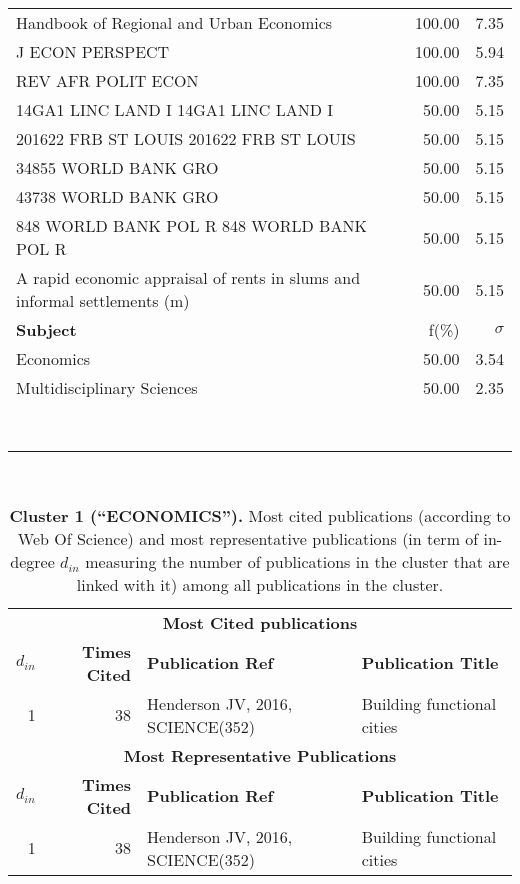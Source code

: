 \documentclass[a4paper,11pt]{report}
\begin{document}
\begin{landscape}
\begin{table}[!ht]
{\begin{tabular}{|p{8cm} r r|}
Handbook of Regional and Urban Economics & 100.00 & 7.35\\
J ECON PERSPECT & 100.00 & 5.94\\
REV AFR POLIT ECON & 100.00 & 7.35\\
14GA1 LINC LAND I 14GA1 LINC LAND I & 50.00 & 5.15\\
201622 FRB ST LOUIS 201622 FRB ST LOUIS & 50.00 & 5.15\\
34855 WORLD BANK GRO & 50.00 & 5.15\\
43738 WORLD BANK GRO & 50.00 & 5.15\\
848 WORLD BANK POL R 848 WORLD BANK POL R & 50.00 & 5.15\\
A rapid economic appraisal of rents in slums and informal settlements (m) & 50.00 & 5.15\\
\hline
{\bf Subject }& f(\%) & $\sigma$\\
\hline
Economics & 50.00 & 3.54\\
Multidisciplinary Sciences & 50.00 & 2.35\\
 &  & \\
 &  & \\
 &  & \\
 &  & \\
 &  & \\
 &  & \\
 &  & \\
 &  & \\
\hline
\end{tabular}
}
\end{table}

\clearpage

\begin{table}[!ht]
\caption*{{\bf Cluster 1 (``ECONOMICS'').} Most cited publications (according to Web Of Science) and most representative publications (in term of in-degree $d_{in}$ measuring the number of publications in the cluster that are linked with it) among all publications in the cluster.}
\textcolor{white}{aa}\\
{\scriptsize\begin{tabular}{|r r p{7cm} p{17cm}|}
\hline
\multicolumn{4}{|c|}{{\bf Most Cited publications}}\\
{\bf $d_{in}$} & {\bf Times Cited} & {\bf Publication Ref} & {\bf Publication Title} \\
1 & 38 & Henderson JV, 2016, SCIENCE(352) & Building functional cities\\
\hline
\hline
\multicolumn{4}{|c|}{{\bf Most Representative Publications}}\\
{\bf $d_{in}$} & {\bf Times Cited} & {\bf Publication Ref} & {\bf Publication Title} \\
1 & 38 & Henderson JV, 2016, SCIENCE(352) & Building functional cities\\
\hline
\end{tabular}
}
\end{table}


\end{landscape}
\end{document}
